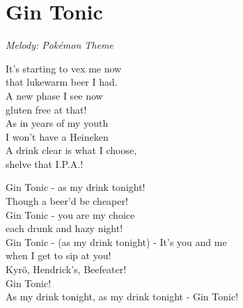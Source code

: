 \section{Gin Tonic}
\textit{Melody: Pokémon Theme}

It's starting to vex me now\\
that lukewarm beer I had.\\
A new phase I see now\\
gluten free at that!\\
As in years of my youth\\
I won't have a Heineken\\
A drink clear is what I choose,\\
shelve that I.P.A.!

Gin Tonic - as my drink tonight!\\
Though a beer'd be cheaper!\\
Gin Tonic - you are my choice\\
each drunk and hazy night!\\
Gin Tonic - (as my drink tonight) - It's you and me\\
when I get to sip at you!\\
Kyrö, Hendrick's, Beefeater!\\
Gin Tonic!\\
As my drink tonight, as my drink tonight - Gin Tonic!